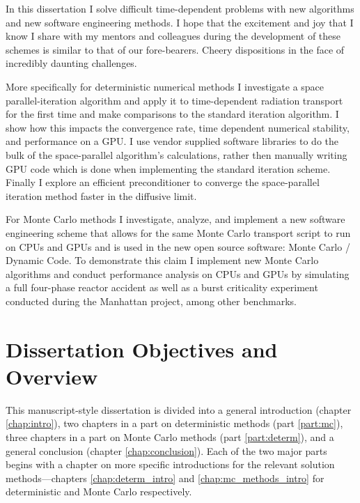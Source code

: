 In this dissertation I solve difficult time-dependent problems with new algorithms and new software engineering methods.
I hope that the excitement and joy that I know I share with my mentors and colleagues during the development of these schemes is similar to that of our fore-bearers.
Cheery dispositions in the face of incredibly daunting challenges.

More specifically for deterministic numerical methods I investigate a space parallel-iteration algorithm and apply it to time-dependent radiation transport for the first time and make comparisons to the standard iteration algorithm.
I show how this impacts the convergence rate, time dependent numerical stability, and performance on a GPU.
I use vendor supplied software libraries to do the bulk of the space-parallel algorithm's calculations, rather then manually writing GPU code which is done when implementing the standard iteration scheme.
Finally I explore an efficient preconditioner to converge the space-parallel iteration method faster in the diffusive limit.

For Monte Carlo methods I investigate, analyze, and implement a new software engineering scheme that allows for the same Monte Carlo transport script to run on CPUs and GPUs and is used in the new open source software: Monte Carlo / Dynamic Code.
To demonstrate this claim I implement new Monte Carlo algorithms and conduct performance analysis on CPUs and GPUs by simulating a full four-phase reactor accident as well as a burst criticality experiment conducted during the Manhattan project, among other benchmarks.

\section{Dissertation Objectives and Overview}
\label{sec:research_qustions}

This manuscript-style dissertation is divided into a general introduction (chapter \ref{chap:intro}), two chapters in a part on deterministic methods (part \ref{part:mc}), three chapters in a part on Monte Carlo methods (part \ref{part:determ}), and a general conclusion (chapter \ref{chap:conclusion}).
Each of the two major parts begins with a chapter on more specific introductions for the relevant solution methods---chapters \ref{chap:determ_intro} and \ref{chap:mc_methods_intro} for deterministic and Monte Carlo respectively.

